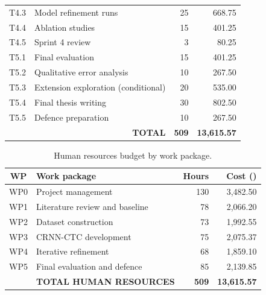 \documentclass[11pt, a4paper]{article}
\begin{document}
\begin{table}[h!]
\begin{tabularx}{\linewidth}{c >{\raggedright\arraybackslash}X r r}
        T4.3 & Model refinement runs & 25 & 668.75 \\
        T4.4 & Ablation studies & 15 & 401.25 \\
        T4.5 & Sprint 4 review & 3 & 80.25 \\
        T5.1 & Final evaluation & 15 & 401.25 \\
        T5.2 & Qualitative error analysis & 10 & 267.50 \\
        T5.3 & Extension exploration (conditional) & 20 & 535.00 \\
        T5.4 & Final thesis writing & 30 & 802.50 \\
        T5.5 & Defence preparation & 10 & 267.50 \\
        \midrule
        \multicolumn{2}{r}{\textbf{TOTAL}} & \textbf{509} & \textbf{13,615.57} \\
        \bottomrule
    \end{tabularx}
\end{table}

\begin{table}[h!]
    \centering
    \caption{Human resources budget by work package.}
    \label{tab:hr-budget}
    \renewcommand{\arraystretch}{1.05}
    \begin{tabularx}{\linewidth}{c >{\raggedright\arraybackslash}X r r}
        \toprule
        \textbf{WP} & \textbf{Work package} & \textbf{Hours} & \textbf{Cost (\EUR{})} \\
        \midrule
        WP0 & Project management & 130 & 3,482.50 \\
        WP1 & Literature review and baseline & 78 & 2,066.20 \\
        WP2 & Dataset construction & 73 & 1,992.55 \\
        WP3 & CRNN-CTC development & 75 & 2,075.37 \\
        WP4 & Iterative refinement & 68 & 1,859.10 \\
        WP5 & Final evaluation and defence & 85 & 2,139.85 \\
        \midrule
        & \textbf{TOTAL HUMAN RESOURCES} & \textbf{509} & \textbf{13,615.57} \\
        \bottomrule
    \end{tabularx}
\end{table}
\end{document}
